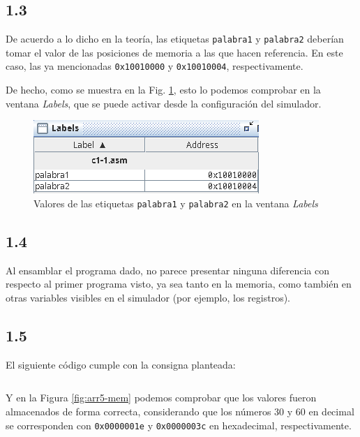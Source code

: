 \documentclass[a4paper]{report}
\begin{document}
\subsection*{1.3}

De acuerdo a lo dicho en la teoría, las etiquetas \texttt{palabra1} y \texttt{palabra2} deberían tomar el valor de las posiciones de memoria a las que hacen referencia. En este caso, las ya mencionadas \texttt{0x10010000} y \texttt{0x10010004}, respectivamente.

De hecho, como se muestra en la Fig. \ref{fig:labels-fst}, esto lo podemos comprobar en la ventana \textit{Labels}, que se puede activar desde la configuración del simulador.

\begin{figure}[h]
    \centering
    \captionsetup{justification = centering}
    \includegraphics[width=.5\linewidth]{img/c1-3}
    \caption{Valores de las etiquetas \texttt{palabra1} y \texttt{palabra2} en la ventana \textit{Labels}}
    \label{fig:labels-fst}
\end{figure}

\subsection*{1.4}

Al ensamblar el programa dado, no parece presentar ninguna diferencia con respecto al primer programa visto, ya sea tanto en la memoria, como también en otras variables visibles en el simulador (por ejemplo, los registros).

\subsection*{1.5}

El siguiente código cumple con la consigna planteada:

\vspace{7pt}
\inputminted[linenos]{mips}{src/cuestiones/c1-5.asm}
\vspace{7pt}

Y en la Figura \ref{fig:arr5-mem} podemos comprobar que los valores fueron almacenados de forma correcta, considerando que los números 30 y 60 en decimal se corresponden con \texttt{0x0000001e} y \texttt{0x0000003c} en hexadecimal, respectivamente.
\end{document}

